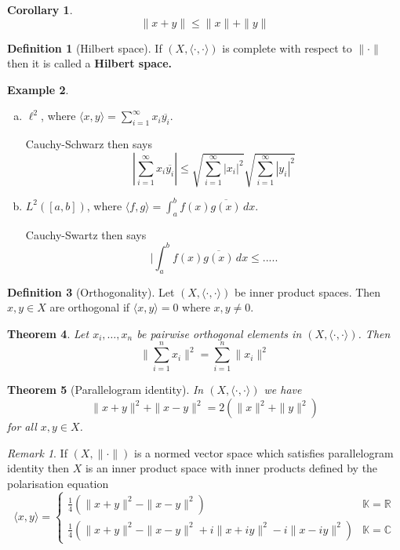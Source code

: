 \documentclass[justified]{tufte-book}
\theoremstyle{plain}%
\newtheorem{thm}{Theorem}[chapter]
\newtheorem*{cor}{Corollary}
\theoremstyle{definition}
\newtheorem{defn}[thm]{Definition}
\newtheorem{exmp}[thm]{Example}
\theoremstyle{remark}
\newtheorem*{rem}{Remark}
\newcommand{\R}{\mathbb{R}}
\newcommand{\K}{\mathbb{K}}
\renewcommand{\C}{\mathbb{C}}
\begin{document}
\begin{cor}
  \[
      \| x + y \| \leq \| x \| + \| y \|
  \]
\end{cor}

\begin{defn}[Hilbert space]
  If $(X, \langle \cdot, \cdot \rangle)$ is complete with respect to $\| \cdot \|$ then it is called a \textbf{Hilbert space.} 
\end{defn}

\begin{exmp}{\ }
  \begin{enumerate}[(a)]
      \item $\ell^2$, where $\langle x, y \rangle = \sum_{i=1}^\infty x_i \overline{y_i}$.  
      
      Cauchy-Schwarz then says \[
          | \sum_{i=1}^\infty x_i \overline{y_i} | \leq \sqrt{ \sum_{i=1}^\infty |x_i|^2} \sqrt{\sum_{i=1}^\infty |y_i|^2}
      \]
      \item $L^2([a,b])$, where $\langle f, g \rangle = \int_a^b f(x) \overline{g(x)} \, dx$. 
      
      Cauchy-Swartz then says \[
          | \int_a^b f(x) \overline{ g(x)} \, dx \leq .....
      \]
  \end{enumerate}
\end{exmp}

\begin{defn}[Orthogonality]
  Let $(X, \langle \cdot , \cdot \rangle )$ be inner product spaces.  Then $x, y \in X $ are orthogonal if $\langle x, y \rangle = 0$ where $x, y \neq 0$.  
\end{defn}

\begin{thm}
  Let $x_i, \dots, x_n$ be pairwise orthogonal elements in $(X, \langle \cdot , \cdot \rangle)$.  Then \[
      \| \sum_{i=1}^n x_i \|^2 = \sum_{i=1}^n \|x_i\|^2
  \]
\end{thm}

\begin{thm}[Parallelogram identity]
  In $(X, \langle \cdot, \cdot \rangle)$ we have \[
       \| x+ y \|^2 + \| x-y \|^2 = 2( \| x \|^2 + \|y \|^2) \tag{$\star$}
  \] for all $x, y \in X$.
\end{thm}

\begin{rem}
  If $(X, \| \cdot \|)$ is a normed vector space which satisfies parallelogram identity then $X$ is an inner product space with inner products defined by the polarisation equation \[
  \langle x, y \rangle =  \begin{cases} 
          \frac{1}{4} \left( \| x + y \|^2 - \| x - y \|^2 \right)    & \K = \R \\
          \frac{1}{4}\left( \| x + y\|^2 - \| x - y \|^2 + i\| x + iy \|^2 - i\|x - iy\|^2 \right)                                                & \K = \C
      \end{cases}
  \]
\end{rem}
\end{document}
